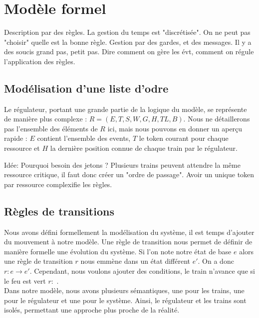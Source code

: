 \documentclass[runningheads]{llncs}
\begin{document}
\section{Modèle formel}
\label{sec:formal-model}

Description par des règles. La gestion du temps est "discrétisée". On ne peut pas "choisir" quelle est la bonne règle. Gestion par des gardes, et des messages. Il y a des soucis grand pas, petit pas. Dire comment on gère les évt, comment on régule l'application des règles. 

\subsection{Modélisation d'une liste d'odre}
Le régulateur, portant une grande partie de la logique du modèle, se représente de manière plus complexe : $R = (E,T,S,W,G,H,TL,B)$.
Nous ne détaillerons pas l'ensemble des éléments de $R$ ici, mais nous pouvons en donner un aperçu rapide : $E$ contient l'ensemble des events,
$T$ le token courant pour chaque ressource et $H$ la dernière position connue de chaque train par le régulateur.

Idée: Pourquoi besoin des jetons ? Plusieurs trains peuvent attendre la même ressource critique, il faut donc créer un "ordre de passage".
Avoir un unique token par ressource complexifie les règles.


\subsection{Règles de transitions}
Nous avons défini formellement la modélisation du système, il est temps d'ajouter du mouvement à notre modèle.
Une règle de transition nous permet de définir de manière formelle une évolution du système. 
Si l'on note notre état de base $e$ alors une règle de transition $r$ nous emmène dans un état différent $e'$. On a donc $r: e \rightarrow e'$.
Cependant, nous voulons ajouter des conditions, le train n'avance que si le feu est vert $r:$ .
\\Dans notre modèle, nous avons plusieurs sémantiques, une pour les trains, une pour le régulateur et une pour le système.
Ainsi, le régulateur et les trains sont isolés, permettant une approche plus proche de la réalité.\\
\end{document}
